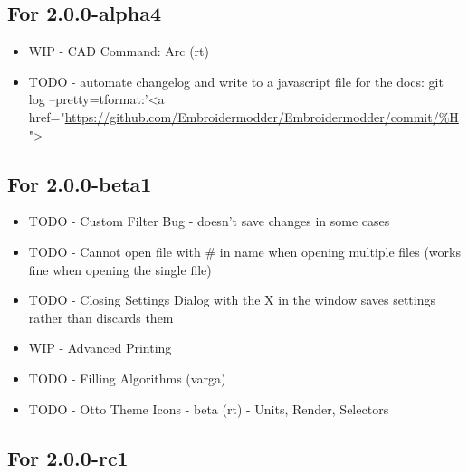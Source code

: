 \documentclass{report}
\begin{document}
\subsection{For 2.0.0-alpha4}

\begin{itemize}
\item WIP - CAD Command: Arc (rt)
\item TODO - automate changelog and write to a javascript file for the docs: git log --pretty=tformat:'<a href="\url{https://github.com/Embroidermodder/Embroidermodder/commit/%H}">%
\end{itemize}

\subsection{For 2.0.0-beta1}

\begin{itemize}
\item TODO - Custom Filter Bug - doesn't save changes in some cases
\item TODO - Cannot open file with \# in name when opening multiple files (works fine when opening the single file)
\item TODO - Closing Settings Dialog with the X in the window saves settings rather than discards them
\item WIP - Advanced Printing
\item TODO - Filling Algorithms (varga)
\item TODO - Otto Theme Icons - beta (rt) - Units, Render, Selectors
\end{itemize}

\subsection{For 2.0.0-rc1}
\end{document}
